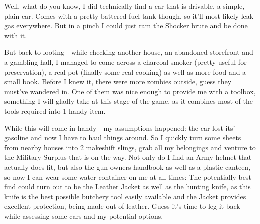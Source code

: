 \documentclass[11pt]{report}
\begin{document}
Well, what do you know, I did technically find a car that is drivable, a simple, plain car. Comes with a pretty battered fuel tank though, so it'll most likely leak gas everywhere. But in a pinch I could just ram the Shocker brute and be done with it.

But back to looting - while checking another house, an abandoned storefront and a gambling hall, I managed to come across a charcoal smoker (pretty useful for preservation), a real pot (finally some real cooking) as well as more food and a small book. Before I knew it, there were more zombies outside, guess they must've wandered in. One of them was nice enough to provide me with a toolbox, something I will gladly take at this stage of the game, as it combines most of the tools required into 1 handy item.

While this will come in handy - my assumptions happened: the car lost its' gasoline and now I have to haul things around. So I quickly turn some sheets from nearby houses into 2 makeshift slings, grab all my belongings and venture to the Military Surplus that is on the way. Not only do I find an Army helmet that actually does fit, but also the gun owners handbook as well as a plastic canteen, so now I can wear some water container on me at all times: The potentially best find could turn out to be the Leather Jacket as well as the hunting knife, as this knife is the best possible butchery tool easily available and the Jacket provides excellent protection, being made out of leather. Guess it's time to leg it back while assessing some cars and my potential options.
\end{document}
